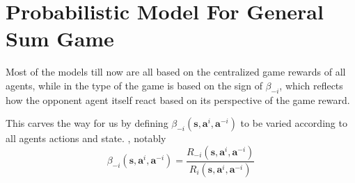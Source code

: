 \blindtext

\section{Probabilistic Model For General Sum Game}
Most of the models till now are all based on the centralized game rewards of all agents, while in \cite{grau2018balancing} the type of the game is based on the sign of $\beta_{-i}$, which reflects how the opponent agent itself react based on its perspective of the game reward.

This carves the way for us by defining $\beta_{-i}(\boldsymbol{s}, \boldsymbol{a}^i, \boldsymbol{a}^{-i})$ to be varied according to all agents actions and state. , notably 
\begin{equation}
    \beta_{-i}(\boldsymbol{s}, \boldsymbol{a}^i, \boldsymbol{a}^{-i}) = \frac{R_{-i}(\boldsymbol{s}, \boldsymbol{a}^i, \boldsymbol{a}^{-i})}{R_i(\boldsymbol{s}, \boldsymbol{a}^i, \boldsymbol{a}^{-i})}
\end{equation}